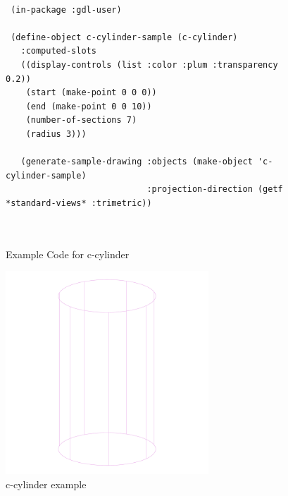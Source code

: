 \documentclass [11pt]{book}
\begin{document}
\begin{itemize}
\begin{figure}
\begin{lrbox}{\boxedverb}
\begin{minipage}{\linewidth}
{\small

\begin{verbatim}

 (in-package :gdl-user)

 (define-object c-cylinder-sample (c-cylinder)
   :computed-slots
   ((display-controls (list :color :plum :transparency 0.2))
    (start (make-point 0 0 0))
    (end (make-point 0 0 10))
    (number-of-sections 7)
    (radius 3)))

   (generate-sample-drawing :objects (make-object 'c-cylinder-sample)
                            :projection-direction (getf *standard-views* :trimetric))
   


\end{verbatim}}
\end{minipage}
\end{lrbox}
\fbox{\usebox{\boxedverb}}

\caption{Example Code for c-cylinder}

\label{fig:example-code-c-cylinder}

\end{figure}

\begin{figure}
\begin{center}
\includegraphics[width=3in,height=3in]{../images/example-c-cylinder.pdf}
\end{center}

\caption{c-cylinder example}

\label{fig:c-cylinder}

\end{figure}






\end{itemize}
\end{document}
